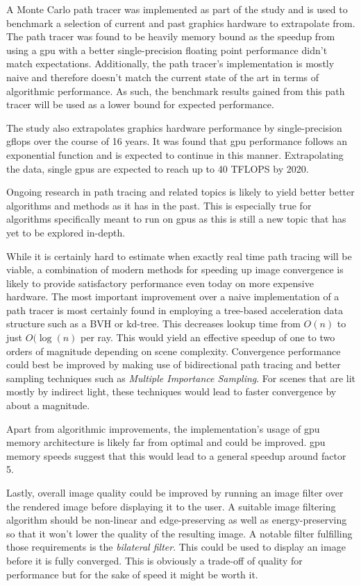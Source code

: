 \documentclass[
  twoside,
  11pt, a4paper,
  footinclude=true,
  headinclude=true,
  cleardoublepage=empty
]{scrreprt}
\begin{document}
A Monte Carlo path tracer was implemented as part of the study and is used to benchmark a selection
of current and past graphics hardware to extrapolate from. The path tracer was found to be heavily
memory bound as the speedup from using a \ac{gpu} with a better single-precision floating
point performance didn't match expectations. Additionally, the path tracer's implementation is
mostly naive and therefore doesn't match the current state of the art in terms of algorithmic
performance. As such, the benchmark results gained from this path tracer will be used as a lower
bound for expected performance.

The study also extrapolates graphics hardware performance by single-precision \ac{gflops} over the
course of 16 years. It was found that \ac{gpu} performance follows an exponential function and is
expected to continue in this manner. Extrapolating the data, single \acp{gpu} are expected to reach up to
40 TFLOPS by 2020.

Ongoing research in path tracing and related topics is likely to yield better better algorithms and
methods as
it has in the past. This is especially true for algorithms specifically meant to run on \acp{gpu}
as this is still a new topic that has yet to be explored in-depth.

While it is certainly hard to estimate when exactly real time path tracing will be viable, a
combination of modern methods for speeding up image convergence is likely to provide satisfactory
performance even today on more expensive hardware. The most important improvement over a naive
implementation of a path tracer
is most certainly found in employing a tree-based acceleration data structure such as a BVH or kd-tree.
This decreases
lookup time from \(O(n)\) to just \(O(\log(n)\) per ray. This would yield an effective speedup of
one to two orders of magnitude depending on scene complexity.
Convergence performance could best be improved by making use of bidirectional path tracing and
better sampling techniques such as \textit{Multiple Importance Sampling}. For scenes that are lit
mostly by indirect light, these techniques would lead to faster convergence by about a magnitude.

Apart from algorithmic improvements, the implementation's usage of \ac{gpu} memory architecture
is likely far from optimal and could be improved. \ac{gpu} memory speeds suggest that this would
lead to a general speedup around factor 5.

Lastly, overall image quality could be improved by running an image filter over the rendered image
before displaying it to the user. A suitable image filtering algorithm should be non-linear and
edge-preserving as well as energy-preserving so that it won't lower the quality of the resulting
image. A notable filter fulfilling those requirements is the \textit{bilateral filter}. This could
be used to display an image before it is fully converged. This is obviously a trade-off of quality
for performance but for the sake of speed it might be worth it.
\end{document}
